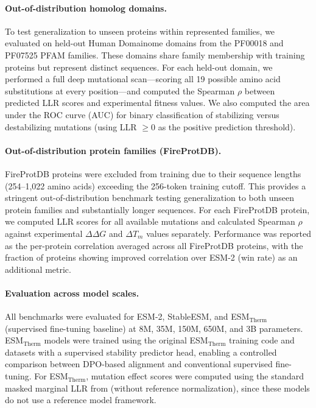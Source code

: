 \paragraph{Out-of-distribution homolog domains.}
To test generalization to unseen proteins within represented families, we evaluated on held-out Human Domainome domains from the PF00018 and PF07525 PFAM families.
These domains share family membership with training proteins but represent distinct sequences.
For each held-out domain, we performed a full deep mutational scan---scoring all 19 possible amino acid substitutions at every position---and computed the Spearman $\rho$ between predicted LLR scores and experimental fitness values.
We also computed the area under the ROC curve (AUC) for binary classification of stabilizing versus destabilizing mutations (using LLR $\geq 0$ as the positive prediction threshold).

\paragraph{Out-of-distribution protein families (FireProtDB).}
FireProtDB proteins were excluded from training due to their sequence lengths (254--1{,}022 amino acids) exceeding the 256-token training cutoff.
This provides a stringent out-of-distribution benchmark testing generalization to both unseen protein families and substantially longer sequences.
For each FireProtDB protein, we computed LLR scores for all available mutations and calculated Spearman $\rho$ against experimental $\Delta\Delta G$ and $\Delta T_m$ values separately.
Performance was reported as the per-protein correlation averaged across all FireProtDB proteins, with the fraction of proteins showing improved correlation over ESM-2 (win rate) as an additional metric.

\paragraph{Evaluation across model scales.}
All benchmarks were evaluated for ESM-2, StableESM, and ESM$_{\text{Therm}}$ (supervised fine-tuning baseline) at 8M, 35M, 150M, 650M, and 3B parameters.
ESM$_{\text{Therm}}$ models were trained using the original ESM$_{\text{Therm}}$ training code and datasets with a supervised stability predictor head, enabling a controlled comparison between DPO-based alignment and conventional supervised fine-tuning.
For ESM$_{\text{Therm}}$, mutation effect scores were computed using the standard masked marginal LLR from \citet{meier2021language} (without reference normalization), since these models do not use a reference model framework.

